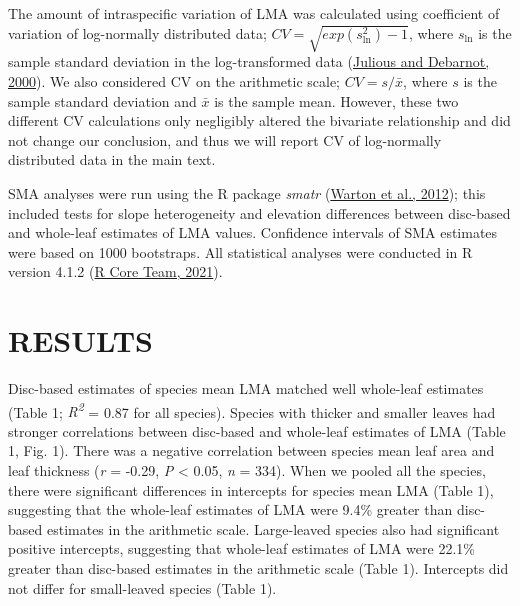 \documentclass[
  12pt,
  a4paper,
,tablecaptionabove
]{scrartcl}
\begin{document}
The amount of intraspecific variation of LMA was calculated using
coefficient of variation of log-normally distributed data;
\(CV = \sqrt{exp(s_{\mathrm{ln}}^2) - 1}\), where \(s_{\mathrm{ln}}\) is
the sample standard deviation in the log-transformed data
(\protect\hyperlink{ref-Julious2000}{Julious and Debarnot, 2000}). We
also considered CV on the arithmetic scale; \(CV = s/\bar{x}\), where
\(s\) is the sample standard deviation and \(\bar{x}\) is the sample
mean. However, these two different CV calculations only negligibly
altered the bivariate relationship and did not change our conclusion,
and thus we will report CV of log-normally distributed data in the main
text.

SMA analyses were run using the R package \emph{smatr}
(\protect\hyperlink{ref-Warton2012a}{Warton et al., 2012}); this
included tests for slope heterogeneity and elevation differences between
disc-based and whole-leaf estimates of LMA values. Confidence intervals
of SMA estimates were based on 1000 bootstraps. All statistical analyses
were conducted in R version 4.1.2
(\protect\hyperlink{ref-RCoreTeam2021}{R Core Team, 2021}).

\hypertarget{results}{%
\section{RESULTS}\label{results}}

Disc-based estimates of species mean LMA matched well whole-leaf
estimates (Table 1; \emph{R\textsuperscript{2}} = 0.87 for all species).
Species with thicker and smaller leaves had stronger correlations
between disc-based and whole-leaf estimates of LMA (Table 1, Fig. 1).
There was a negative correlation between species mean leaf area and leaf
thickness (\emph{r} = -0.29, \emph{P} \textless{} 0.05, \emph{n} = 334).
When we pooled all the species, there were significant differences in
intercepts for species mean LMA (Table 1), suggesting that the
whole-leaf estimates of LMA were 9.4\% greater than disc-based estimates
in the arithmetic scale. Large-leaved species also had significant
positive intercepts, suggesting that whole-leaf estimates of LMA were
22.1\% greater than disc-based estimates in the arithmetic scale (Table
1). Intercepts did not differ for small-leaved species (Table 1).
\end{document}
